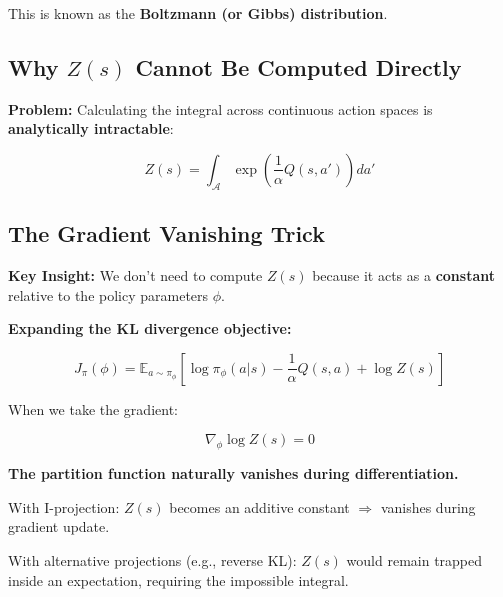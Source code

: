 \documentclass[12pt,a4paper]{article}
\theoremstyle{noteplain}
\theoremstyle{noteexercise}
\begin{document}
This is known as the \textbf{Boltzmann (or Gibbs) distribution}.



\subsection{Why $Z(s)$ Cannot Be Computed Directly}\label{ssec:z-impossible}



\textbf{Problem:} Calculating the integral across continuous action spaces is \textbf{analytically intractable}:

$$Z(s) = \int_{\mathcal{A}} \exp\left(\frac{1}{\alpha}Q(s, a')\right) da'$$



\subsection{The Gradient Vanishing Trick}\label{ssec:gradient-vanish}



\textbf{Key Insight:} We don't need to compute $Z(s)$ because it acts as a \textbf{constant} relative to the policy parameters $\phi$.

\textbf{Expanding the KL divergence objective:}

$$J_\pi(\phi) = \mathbb{E}_{a \sim \pi_\phi}\left[\log\pi_\phi(a|s) - \frac{1}{\alpha}Q(s,a) + \log Z(s)\right]$$

When we take the gradient:

\begin{equation}\label{eq:grad-zero}
\boxed{\nabla_\phi \log Z(s) = 0}
\end{equation}

\textbf{The partition function naturally vanishes during differentiation.}
\begin{keypoint}

With I-projection: $Z(s)$ becomes an additive constant $\Longrightarrow$ vanishes during gradient update.

With alternative projections (e.g., reverse KL): $Z(s)$ would remain trapped inside an expectation, requiring the impossible integral.

\end{keypoint}




\end{document}
